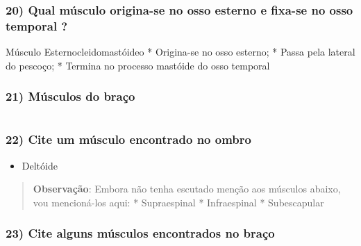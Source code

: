 \documentclass[
]{book}
\providecommand{\tightlist}{%
  \setlength{\itemsep}{0pt}\setlength{\parskip}{0pt}}
\begin{document}
\hypertarget{qual-muxfasculo-origina-se-no-osso-esterno-e-fixa-se-no-osso-temporal}{%
\subsubsection*{20) Qual músculo origina-se no osso esterno e fixa-se no osso temporal ?}\label{qual-muxfasculo-origina-se-no-osso-esterno-e-fixa-se-no-osso-temporal}}

Músculo Esternocleidomastóideo
* Origina-se no osso esterno;
* Passa pela lateral do pescoço;
* Termina no processo mastóide do osso temporal

\hypertarget{muxfasculos-do-brauxe7o-2}{%
\subsubsection*{21) Músculos do braço}\label{muxfasculos-do-brauxe7o-2}}

\begin{longtable}[]{@{}
  >{\centering\arraybackslash}p{}
  >{\centering\arraybackslash}p{}@{}}
\toprule()
\endhead
\bottomrule()
\end{longtable}

\hypertarget{cite-um-muxfasculo-encontrado-no-ombro}{%
\subsubsection*{22) Cite um músculo encontrado no ombro}\label{cite-um-muxfasculo-encontrado-no-ombro}}

\begin{itemize}
\tightlist
\item
  Deltóide
\end{itemize}

\begin{quote}
\textbf{Observação}: Embora não tenha escutado menção aos músculos abaixo, vou mencioná-los aqui:
* Supraespinal
* Infraespinal
* Subescapular
\end{quote}

\hypertarget{cite-alguns-muxfasculos-encontrados-no-brauxe7o}{%
\subsubsection*{23) Cite alguns músculos encontrados no braço}\label{cite-alguns-muxfasculos-encontrados-no-brauxe7o}}
\end{document}
